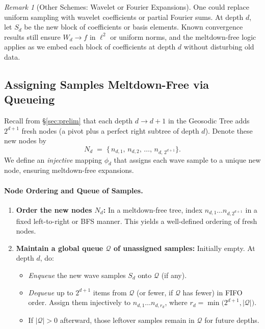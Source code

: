 \documentclass[acmsmall]{acmart}
\theoremstyle{definition}
\theoremstyle{remark}
\newtheorem*{remark}{Remark}
\begin{document}
\begin{remark}[Other Schemes: Wavelet or Fourier Expansions]
  \label{rem:wavelets-fourier}
  One could replace uniform sampling with wavelet coefficients or partial
  Fourier sums. At depth $d$, let $S_d$ be the new block of coefficients
  or basis elements. Known convergence results still ensure $W_d \to f$ in
  $\ell^2$ or uniform norms, and the meltdown-free logic applies as we embed
  each block of coefficients at depth $d$ without disturbing old data.
\end{remark}

\subsection{Assigning Samples Meltdown-Free via Queueing}
\label{subsec:wave-embedding}

Recall from \S\ref{sec:prelim} that each depth $d\to d+1$ in the Geosodic Tree
adds $2^{d+1}$ fresh nodes (a pivot plus a perfect right subtree of depth $d$).
Denote these new nodes by
\[
  N_d \;=\;
  \{\,n_{d,1},\,n_{d,2},\,\dots,\,n_{d,\,2^{d+1}}\}.
\]
We define an \emph{injective} mapping $\phi_d$ that assigns each wave sample
to a unique new node, ensuring meltdown-free expansions.

\paragraph{Node Ordering and Queue of Samples.}
\begin{enumerate}
  \item \textbf{Order the new nodes $N_d$:}  
    In a meltdown-free tree, index $n_{d,1}\dots n_{d,2^{d+1}}$ in a fixed
    left-to-right or BFS manner. This yields a well-defined ordering of fresh nodes.
  \item \textbf{Maintain a global queue $\mathcal{Q}$ of unassigned samples:}  
    Initially empty. At depth $d$, do:
    \begin{itemize}
      \item \emph{Enqueue} the new wave samples $S_d$ onto $\mathcal{Q}$ (if any).
      \item \emph{Dequeue} up to $2^{d+1}$ items from $\mathcal{Q}$ (or fewer, if $\mathcal{Q}$ has fewer)
            in FIFO order. Assign them injectively to $n_{d,1}\dots n_{d,r_d}$, where
            $r_d = \min\bigl(2^{d+1}, \lvert\mathcal{Q}\rvert\bigr)$.  
      \item If $\lvert\mathcal{Q}\rvert > 0$ afterward, those leftover samples remain
            in $\mathcal{Q}$ for future depths.
    \end{itemize}
\end{enumerate}
\end{document}
